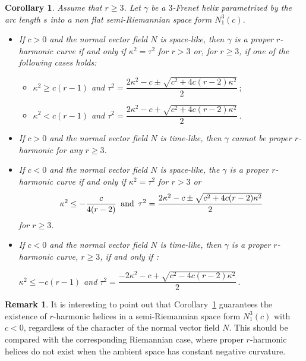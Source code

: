 \documentclass[11pt]{amsart}
\theoremstyle{plain}
\newtheorem{corollary}    [theorem]  {Corollary}
\theoremstyle{definition}
\newtheorem{remark}       [theorem]  {Remark}
\numberwithin{equation}{section}
\begin{document}
\begin{corollary}\label{Cor-tecnico}
Assume that $r \geq 3$. Let $\gamma$ be a $3$-Frenet helix parametrized by the arc length $s$ into a non flat semi-Riemannian space form $N^{3}_1(c)$. 
\begin{itemize}
\item[(i)] If $c>0$ and the normal vector field $N$ is space-like, then $\gamma$ is a proper $r$-harmonic curve if and only if $\kappa^2 = \tau^2$ for $r > 3$ or, for $r \geq 3$, if one of the following cases holds:
\vspace{0.6 mm}
\begin{itemize}
\item[(a)] $\kappa^2 \geq c(r-1)$ and $\tau^2 = \dfrac{2\kappa^2 - c \pm \sqrt{c^2 + 4c(r-2)\kappa^2}}{2}\,;$
\item[(b)] $\kappa^2 < c(r-1)$ and $\tau^2 = \dfrac{2\kappa^2 - c + \sqrt{c^2 + 4c(r-2)\kappa^2}}{2}\,.$
\end{itemize}
\vspace{0.6 mm}
\item[(ii)] If $c>0$ and the normal vector field $N$ is time-like, then $\gamma$ cannot be proper $r$-harmonic  for any $r \geq 3$.
\vspace{0.6 mm}
\item[(iii)] If $c<0$ and the normal vector field $N$ is space-like, the $\gamma$ is a proper $r$-harmonic curve if and only if $\kappa^2 = \tau^2$ for $r > 3$ or
$$\kappa^2 \leq - \dfrac{c}{4 (r-2)} \,\,\,{\rm and} \,\,\,\tau^2 = \dfrac{2\kappa^2 - c \pm \sqrt{c^2 + 4c(r-2)\kappa^2}}{2}$$
for $r \geq 3 $.
\vspace{0.6 mm}
\item[(iv)] If $c<0$ and the normal vector field $N$ is time-like, then $\gamma$ is a proper $r$-harmonic curve, $r \geq 3$, if and only if :
\vspace{0.6 mm}

 $\kappa^2 \leq -c(r-1)$ and $\tau^2 = \dfrac{-2\kappa^2 - c + \sqrt{c^2 - 4c(r-2)\kappa^2}}{2}\,.$
\end{itemize}
\end{corollary}

\begin{remark}
It is interesting to point out that Corollary~\ref{Cor-tecnico} guarantees the existence of \( r \)-harmonic helices in a semi-Riemannian space form \( N^{3}_1(c) \) with \( c < 0 \), regardless of the character of the normal vector field $N$. This should be compared with the corresponding Riemannian case, where proper $r$-harmonic helices do not exist when the ambient space has constant negative curvature.
\end{remark}
\end{document}
